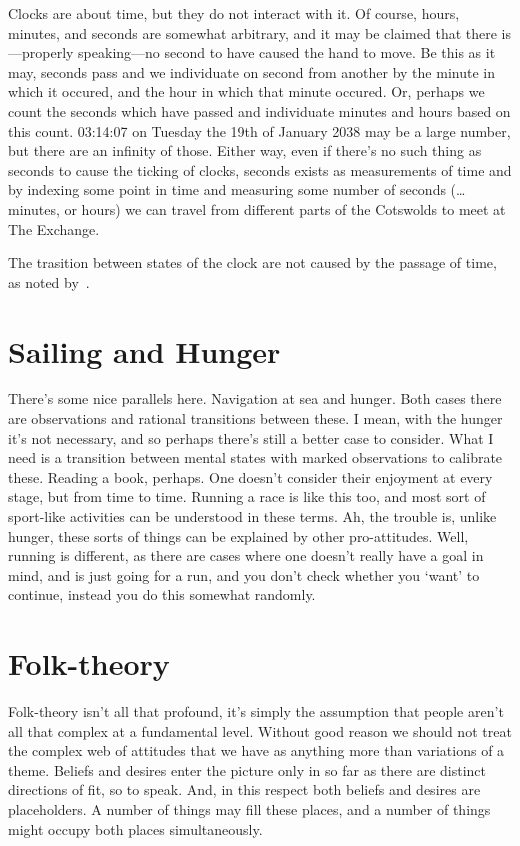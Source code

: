 \documentclass[10pt]{article}
\begin{document}
Clocks are about time, but they do not interact with it.
Of course, hours, minutes, and seconds are somewhat arbitrary, and it may be claimed that there is---properly speaking---no second to have caused the hand to move.
Be this as it may, seconds pass and we individuate on second from another by the minute in which it occured, and the hour in which that minute occured.
Or, perhaps we count the seconds which have passed and individuate minutes and hours based on this count.
03:14:07 on Tuesday the 19th of January 2038 may be a large number, but there are an infinity of those.
Either way, even if there's no such thing as seconds to cause the ticking of clocks, seconds exists as measurements of time and by indexing some point in time and measuring some number of seconds (\dots minutes, or hours) we can travel from different parts of the Cotswolds to meet at The Exchange.

The trasition between states of the clock are not caused by the passage of time, as noted by~\textcite{Smith:1988aa}.

\section{Sailing and Hunger}
\label{sec:sailing-hunger}

There's some nice parallels here.
Navigation at sea and hunger.
Both cases there are observations and rational transitions between these.
I mean, with the hunger it's not necessary, and so perhaps there's still a better case to consider.
What I need is a transition between mental states with marked observations to calibrate these.
Reading a book, perhaps.
One doesn't consider their enjoyment at every stage, but from time to time.
Running a race is like this too, and most sort of sport-like activities can be understood in these terms.
Ah, the trouble is, unlike hunger, these sorts of things can be explained by other pro-attitudes.
Well, running is different, as there are cases where one doesn't really have a goal in mind, and is just going for a run, and you don't check whether you `want' to continue, instead you do this somewhat randomly.



\section{Folk-theory}
\label{sec:folk-theory}

Folk-theory isn't all that profound, it's simply the assumption that people aren't all that complex at a fundamental level.
Without good reason we should not treat the complex web of attitudes that we have as anything more than variations of a theme.
Beliefs and desires enter the picture only in so far as there are distinct directions of fit, so to speak.
And, in this respect both beliefs and desires are placeholders.
A number of things may fill these places, and a number of things might occupy both places simultaneously.
\end{document}
